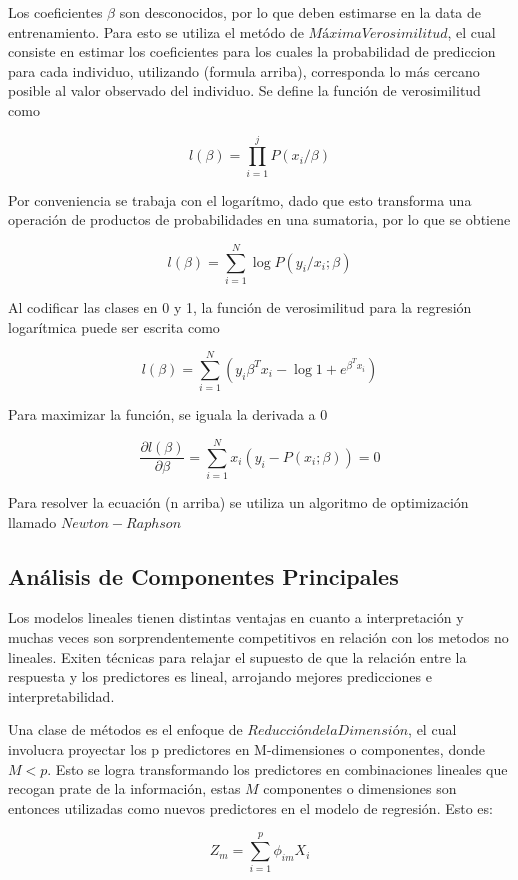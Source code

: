 \documentclass[a4paper,12pt]{Latex/Classes/PhDthesisPSnPDF}
\begin{document}
Los coeficientes $\beta$ son desconocidos, por lo que deben estimarse en la data de entrenamiento. Para esto se utiliza el metódo de $Máxima Verosimilitud$, el cual consiste en estimar los coeficientes para los cuales la probabilidad de prediccion para cada individuo, utilizando (formula arriba), corresponda lo más cercano posible al valor observado del individuo. Se define la función de verosimilitud como

$$ l(\beta) = \prod_{i=1}^{j}{P(x_{i} / \beta)} $$
  
Por conveniencia se  trabaja con el logarítmo, dado que esto transforma una operación de productos de probabilidades en una sumatoria, por lo que se obtiene

$$ l(\beta) = \sum_{i=1}^{N} \log{P(y_{i}/ x_{i}; \beta)} $$

Al codificar las clases en 0 y 1, la función de verosimilitud para la regresión logarítmica puede ser escrita como

$$ l(\beta) = \sum_{i=1}^{N}(y_{i}\beta^{T}x_{i} - \log{1 + e^{\beta^{T}x_{i}}}) $$

Para maximizar la función, se iguala la derivada a 0

$$ \frac{\partial l(\beta)}{\partial \beta} = \sum_{i=1}^{N}x_{i}(y_{i} - P(x_{i}; \beta)) = 0 $$

Para resolver la ecuación (n arriba) se utiliza un algoritmo de optimización llamado $Newton-Raphson$

\subsection{Análisis de Componentes Principales}

Los modelos lineales tienen distintas ventajas en cuanto a interpretación y muchas veces son sorprendentemente competitivos en relación con los metodos no lineales. Exiten técnicas para relajar el supuesto de  que la relación entre la respuesta y los predictores es lineal, arrojando mejores predicciones e interpretabilidad. 

Una clase de métodos es el enfoque de $Reducción de la Dimensión$, el cual involucra proyectar los p predictores en M-dimensiones o componentes, donde $M < p$. Esto se logra transformando los predictores en combinaciones lineales que recogan prate de la información, estas $M$ componentes o dimensiones son entonces utilizadas como nuevos predictores en el modelo de regresión. Esto es:

$$ Z_{m} = \sum_{i = 1}^{p} \phi_{im}X_{i} $$
\end{document}
